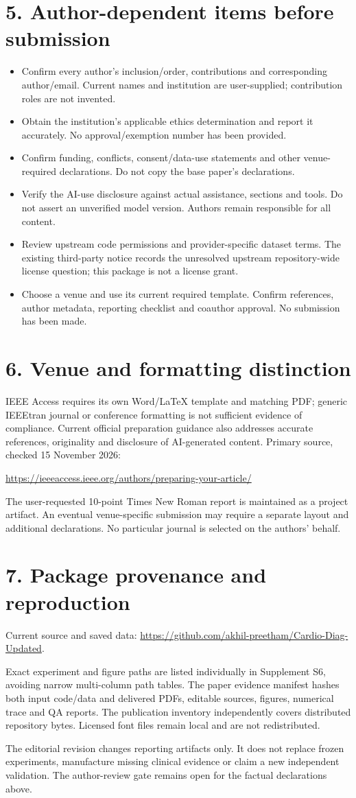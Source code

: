 \documentclass[10pt]{article}
\let\originalsection\section
\renewcommand\section{\Needspace{6\baselineskip}\originalsection}
\begin{document}
\section*{5. Author-dependent items before submission}
\begin{itemize}
\item Confirm every author's inclusion/order, contributions and corresponding author/email. Current names and institution are user-supplied; contribution roles are not invented.
\item Obtain the institution's applicable ethics determination and report it accurately. No approval/exemption number has been provided.
\item Confirm funding, conflicts, consent/data-use statements and other venue-required declarations. Do not copy the base paper's declarations.
\item Verify the AI-use disclosure against actual assistance, sections and tools. Do not assert an unverified model version. Authors remain responsible for all content.
\item Review upstream code permissions and provider-specific dataset terms. The existing third-party notice records the unresolved upstream repository-wide license question; this package is not a license grant.
\item Choose a venue and use its current required template. Confirm references, author metadata, reporting checklist and coauthor approval. No submission has been made.
\end{itemize}

\section*{6. Venue and formatting distinction}
IEEE Access requires its own Word/LaTeX template and matching PDF; generic IEEEtran journal or conference formatting is not sufficient evidence of compliance. Current official preparation guidance also addresses accurate references, originality and disclosure of AI-generated content. Primary source, checked 15 November 2026:
\par\url{https://ieeeaccess.ieee.org/authors/preparing-your-article/}

The user-requested 10-point Times New Roman report is maintained as a project artifact. An eventual venue-specific submission may require a separate layout and additional declarations. No particular journal is selected on the authors' behalf.

\section*{7. Package provenance and reproduction}
Current source and saved data: \url{https://github.com/akhil-preetham/Cardio-Diag-Updated}.
\par Exact experiment and figure paths are listed individually in Supplement S6, avoiding narrow multi-column path tables. The paper evidence manifest hashes both input code/data and delivered PDFs, editable sources, figures, numerical trace and QA reports. The publication inventory independently covers distributed repository bytes. Licensed font files remain local and are not redistributed.

The editorial revision changes reporting artifacts only. It does not replace frozen experiments, manufacture missing clinical evidence or claim a new independent validation. The author-review gate remains open for the factual declarations above.
\end{document}
